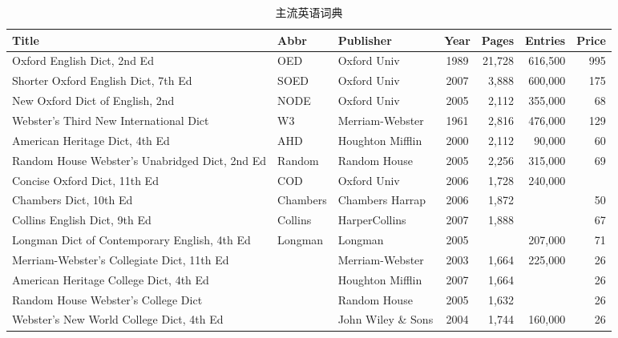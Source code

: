 \begin{sidewaystable}[htbp]
\caption{主流英语词典}
\label{tab:dict}
\centering
\begin{tabularx}{550pt}{Xllcrrr}
    \toprule
    Title & Abbr & Publisher & Year & Pages & Entries & Price \\
    \midrule
    Oxford English Dict, 2nd Ed & OED & Oxford Univ 
        & 1989 & 21,728 & 616,500 & 995 \\
    \midrule
    Shorter Oxford English Dict, 7th Ed & SOED & Oxford Univ 
        & 2007 & 3,888 & 600,000 & 175 \\
    New Oxford Dict of English, 2nd & NODE & Oxford Univ 
        & 2005 & 2,112 & 355,000 & 68 \\
    Webster's Third New International Dict & W3 & Merriam-Webster
        & 1961 & 2,816 & 476,000 & 129 \\
    American Heritage Dict, 4th Ed & AHD & Houghton Mifflin
        & 2000 & 2,112 & 90,000 & 60 \\
    Random House Webster's Unabridged Dict, 2nd Ed & Random & Random House 
        & 2005 & 2,256 & 315,000 & 69 \\
    \midrule
    Concise Oxford Dict, 11th Ed & COD & Oxford Univ
        & 2006 & 1,728 & 240,000 & \\
    Chambers Dict, 10th Ed & Chambers & Chambers Harrap 
        & 2006 & 1,872 & & 50 \\
    Collins English Dict, 9th Ed & Collins & HarperCollins
        & 2007 & 1,888 & & 67 \\
    Longman Dict of Contemporary English, 4th Ed & Longman & Longman 
        & 2005 & & 207,000 & 71 \\
    Merriam-Webster's Collegiate Dict, 11th Ed & & Merriam-Webster 
        & 2003 & 1,664 & 225,000 & 26 \\
    American Heritage College Dict, 4th Ed & & Houghton Mifflin 
        & 2007 & 1,664 & & 26 \\
    Random House Webster's College Dict & & Random House 
        & 2005 & 1,632 & & 26 \\
    Webster's New World College Dict, 4th Ed & & John Wiley \& Sons
        & 2004 & 1,744 & 160,000 & 26 \\
    \bottomrule
\end{tabularx}
\end{sidewaystable}
